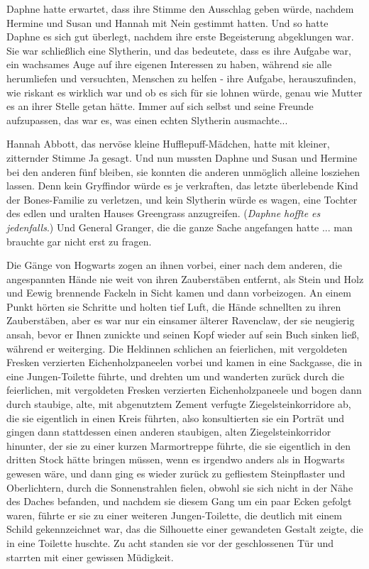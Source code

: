 Daphne hatte erwartet, dass ihre Stimme den Ausschlag geben würde, nachdem
Hermine und Susan und Hannah mit Nein gestimmt hatten. Und so hatte Daphne es
sich gut überlegt, nachdem ihre erste Begeisterung abgeklungen war. Sie war
schließlich eine Slytherin, und das bedeutete, dass es ihre Aufgabe war, ein
wachsames Auge auf ihre eigenen Interessen zu haben, während sie alle
herumliefen und versuchten, Menschen zu helfen - ihre Aufgabe, herauszufinden,
wie riskant es wirklich war und ob es sich für sie lohnen würde, genau wie
Mutter es an ihrer Stelle getan hätte. Immer auf sich selbst und seine Freunde
aufzupassen, das war es, was einen echten Slytherin ausmachte...

Hannah Abbott, das nervöse kleine Hufflepuff-Mädchen, hatte mit kleiner,
zitternder Stimme \glqq Ja\grqq{} gesagt. Und nun mussten Daphne und Susan und
Hermine bei den anderen fünf bleiben, sie konnten die anderen unmöglich alleine
losziehen lassen. Denn kein Gryffindor würde es je verkraften, das letzte
überlebende Kind der Bones-Familie zu verletzen, und kein Slytherin würde es
wagen, eine Tochter des edlen und uralten Hauses Greengrass anzugreifen.
(\emph{Daphne hoffte es jedenfalls}.) Und General Granger, die die ganze Sache
angefangen hatte ... man brauchte gar nicht erst zu fragen.

Die Gänge von Hogwarts zogen an ihnen vorbei, einer nach dem anderen, die
angespannten Hände nie weit von ihren Zauberstäben entfernt, als Stein und Holz
und Eewig brennende Fackeln in Sicht kamen und dann vorbeizogen. An einem Punkt
hörten sie Schritte und holten tief Luft, die Hände schnellten zu ihren
Zauberstäben, aber es war nur ein einsamer älterer Ravenclaw, der sie neugierig
ansah, bevor er Ihnen zunickte und seinen Kopf wieder auf sein Buch sinken ließ,
während er weiterging. Die Heldinnen schlichen an feierlichen, mit vergoldeten
Fresken verzierten Eichenholzpaneelen vorbei und kamen in eine Sackgasse, die in
eine Jungen-Toilette führte, und drehten um und wanderten zurück durch die
feierlichen, mit vergoldeten Fresken verzierten Eichenholzpaneele und bogen dann
durch staubige, alte, mit abgenutztem Zement verfugte Ziegelsteinkorridore ab,
die sie eigentlich in einen Kreis führten, also konsultierten sie ein Porträt
und gingen dann stattdessen einen anderen staubigen, alten Ziegelsteinkorridor
hinunter, der sie zu einer kurzen Marmortreppe führte, die sie eigentlich in den
dritten Stock hätte bringen müssen, wenn es irgendwo anders als in Hogwarts
gewesen wäre, und dann ging es wieder zurück zu gefliestem Steinpflaster und
Oberlichtern, durch die Sonnenstrahlen fielen, obwohl sie sich nicht in der Nähe
des Daches befanden, und nachdem sie diesem Gang um ein paar Ecken gefolgt
waren, führte er sie zu einer weiteren Jungen-Toilette, die deutlich mit einem
Schild gekennzeichnet war, das die Silhouette einer gewandeten Gestalt zeigte,
die in eine Toilette huschte. Zu acht standen sie vor der geschlossenen Tür und
starrten mit einer gewissen Müdigkeit.

